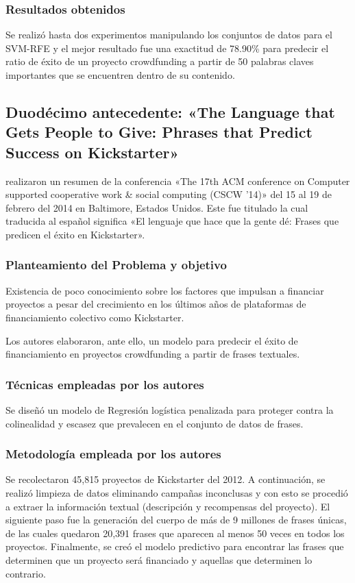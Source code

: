 \subsubsection{Resultados obtenidos}
Se realizó hasta dos experimentos manipulando los conjuntos de datos para el SVM-RFE y el mejor resultado fue una exactitud de 78.90\% para predecir el ratio de éxito de un proyecto crowdfunding a partir de 50 palabras claves importantes que se encuentren dentro de su contenido.

\subsection{Duodécimo antecedente: «The Language that Gets People to Give: Phrases that Predict Success on Kickstarter» \citep*{pr_mitra2014phrases}}
\citeauthor{pr_mitra2014phrases} realizaron un resumen de la conferencia «The 17th ACM conference on Computer supported cooperative work \& social computing (CSCW '14)» del 15 al 19 de febrero del 2014 en Baltimore, Estados Unidos. Este fue titulado  la cual traducida al español significa «El lenguaje que hace que la gente dé: Frases que predicen el éxito en Kickstarter».

\subsubsection{Planteamiento del Problema y objetivo}
Existencia de poco conocimiento sobre los factores que impulsan a financiar proyectos a pesar del crecimiento en los últimos años de plataformas de financiamiento colectivo como Kickstarter.

Los autores elaboraron, ante ello, un modelo para predecir el éxito de financiamiento en proyectos crowdfunding a partir de frases textuales.

\subsubsection{Técnicas empleadas por los autores}
Se diseñó un modelo de Regresión logística penalizada para proteger contra la colinealidad y escasez que prevalecen en el conjunto de datos de frases.

\subsubsection{Metodología empleada por los autores}
Se recolectaron 45,815 proyectos de Kickstarter del 2012. A continuación, se realizó limpieza de datos eliminando campañas inconclusas y con esto se procedió a extraer la información textual (descripción y recompensas del proyecto). El siguiente paso fue la generación del cuerpo de más de 9 millones de frases únicas, de las cuales quedaron 20,391 frases que aparecen al menos 50 veces en todos los proyectos. Finalmente, se creó el modelo predictivo para encontrar las frases que determinen que un proyecto será financiado y aquellas que determinen lo contrario.

